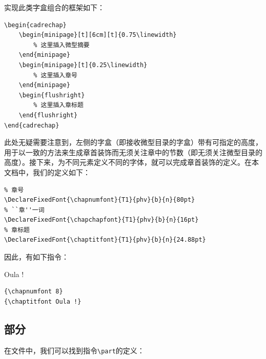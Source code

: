 
实现此类字盒组合的框架如下：

\begin{dmd}
\begin{verbatim}
\begin{cadrechap}
    \begin{minipage}[t][6cm][t]{0.75\linewidth}
        % 这里插入微型摘要 
    \end{minipage} 
    \begin{minipage}[t]{0.25\linewidth}
        % 这里插入章号
    \end{minipage}
    \begin{flushright}
        % 这里插入章标题
    \end{flushright}
\end{cadrechap}\end{verbatim}
\end{dmd}

此处无疑需要注意到，左侧的字盒（即接收微型目录的字盒）带有可指定的高度，用于以一致的方法来生成章首装饰而无须关注章中的节数（即无须关注微型目录的高度）。接下来，为不同元素定义不同的字体，就可以完成章首装饰的定义。在本文档中，我们的定义如下：

\begin{dmd}
\begin{verbatim}
% 章号
\DeclareFixedFont{\chapnumfont}{T1}{phv}{b}{n}{80pt}
% ``章''一词
\DeclareFixedFont{\chapchapfont}{T1}{phv}{b}{n}{16pt}
% 章标题
\DeclareFixedFont{\chaptitfont}{T1}{phv}{b}{n}{24.88pt}\end{verbatim}
\end{dmd}


因此，有如下指令：

\begin{codelist}[10.2]{
    {}
    {\chaptitfont Oula !}
}
\begin{verbatim}
{\chapnumfont 8}
{\chaptitfont Oula !}\end{verbatim}
\end{codelist}

\subsection{部分}

在文件中，我们可以找到指令\verb|\part|的定义：

